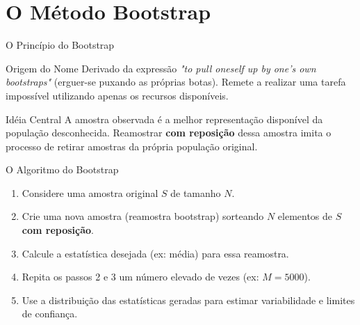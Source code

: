 \section{O Método Bootstrap}

\begin{frame}{O Princípio do Bootstrap}
    \begin{block}{Origem do Nome}
        Derivado da expressão \textit{"to pull oneself up by one's own bootstraps"} (erguer-se puxando as próprias botas). Remete a realizar uma tarefa impossível utilizando apenas os recursos disponíveis.
    \end{block}
    
    \begin{block}{Idéia Central}
        A amostra observada é a melhor representação disponível da população desconhecida. 
        Reamostrar \textbf{com reposição} dessa amostra imita o processo de retirar amostras da própria população original.
    \end{block}
\end{frame}

\begin{frame}{O Algoritmo do Bootstrap}
    \begin{enumerate}
        \item Considere uma amostra original $S$ de tamanho $N$.
        \item Crie uma nova amostra (reamostra bootstrap) sorteando $N$ elementos de $S$ \textbf{com reposição}.
        \item Calcule a estatística desejada (ex: média) para essa reamostra.
        \item Repita os passos 2 e 3 um número elevado de vezes (ex: $M = 5000$).
        \item Use a distribuição das estatísticas geradas para estimar variabilidade e limites de confiança.
    \end{enumerate}
\end{frame}

